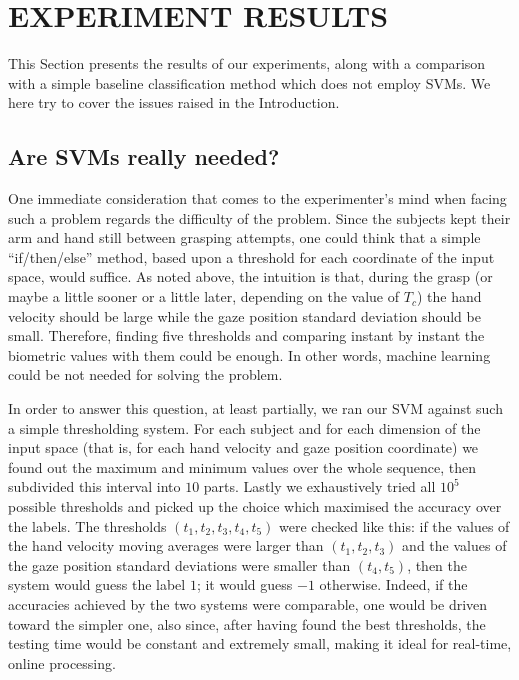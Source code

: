 \documentclass[a4paper,10pt,conference]{ieeeconf}
\begin{document}
\section{EXPERIMENT RESULTS}
\label{sec:res}

This Section presents the results of our experiments, along with a
comparison with a simple baseline classification method which does not
employ SVMs. We here try to cover the issues raised in the
Introduction.

\subsection{Are SVMs really needed?}

One immediate consideration that comes to the experimenter's mind when
facing such a problem regards the difficulty of the problem. Since the
subjects kept their arm and hand still between grasping attempts, one
could think that a simple ``if/then/else'' method, based upon a
threshold for each coordinate of the input space, would suffice. As
noted above, the intuition is that, during the grasp (or maybe a
little sooner or a little later, depending on the value of $T_c$) the
hand velocity should be large while the gaze position standard
deviation should be small. Therefore, finding five thresholds and
comparing instant by instant the biometric values with them could be
enough. In other words, machine learning could be not needed for
solving the problem.

In order to answer this question, at least partially, we ran our SVM
against such a simple thresholding system. For each subject and for
each dimension of the input space (that is, for each hand velocity and
gaze position coordinate) we found out the maximum and minimum values
over the whole sequence, then subdivided this interval into $10$
parts. Lastly we exhaustively tried all $10^5$ possible thresholds and
picked up the choice which maximised the accuracy over the labels. The
thresholds $(t_1,t_2,t_3,t_4,t_5)$ were checked like this: if the
values of the hand velocity moving averages were larger than
$(t_1,t_2,t_3)$ and the values of the gaze position standard
deviations were smaller than $(t_4,t_5)$, then the system would guess
the label $1$; it would guess $-1$ otherwise. Indeed, if the
accuracies achieved by the two systems were comparable, one would be
driven toward the simpler one, also since, after having found the best
thresholds, the testing time would be constant and extremely small,
making it ideal for real-time, online processing.
\end{document}
